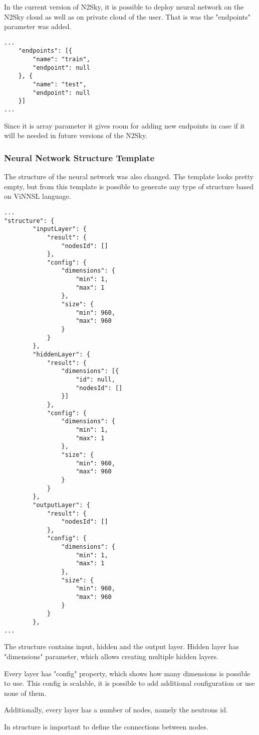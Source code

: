 In the current version of N2Sky, it is possible to deploy neural network on the N2Sky cloud as well as on private cloud of the user. That is was the "endpoints" parameter was added.

\begin{lstlisting}
...
    "endpoints": [{
        "name": "train",
        "endpoint": null
    }, {
        "name": "test",
        "endpoint": null
    }]
...
\end{lstlisting}

Since it is array parameter it gives room for adding new endpoints in case if it will be needed in future versions of the N2Sky.

\subsubsection{Neural Network Structure Template}\label{Neural Network Structure Template}

The structure of the neural network was also changed. The template looks pretty empty, but from this template is possible to generate any type of structure based on ViNNSL language. 

\begin{lstlisting}
...
"structure": {
		"inputLayer": {
			"result": {
				"nodesId": []
			},
			"config": {
				"dimensions": {
					"min": 1,
					"max": 1
				},
				"size": {
					"min": 960,
					"max": 960
				}
			}
		},
		"hiddenLayer": {
			"result": {
				"dimensions": [{
					"id": null,
					"nodesId": []
				}]
			},
			"config": {
				"dimensions": {
					"min": 1,
					"max": 1
				},
				"size": {
					"min": 960,
					"max": 960
				}
			}
		},
		"outputLayer": {
			"result": {
				"nodesId": []
			},
			"config": {
				"dimensions": {
					"min": 1,
					"max": 1
				},
				"size": {
					"min": 960,
					"max": 960
				}
			}
		},
...
\end{lstlisting}

The structure contains input, hidden and the output layer. Hidden layer has "dimensions" parameter, which allows creating multiple hidden layers.

 Every layer has "config" property, which shows how many dimensions is possible to use. This config is scalable, it is possible to add additional configuration or use none of them.
 
 Additionally, every layer has a number of nodes, namely the neutrons id.  
 
 In structure is important to define the connections between nodes. 
 

